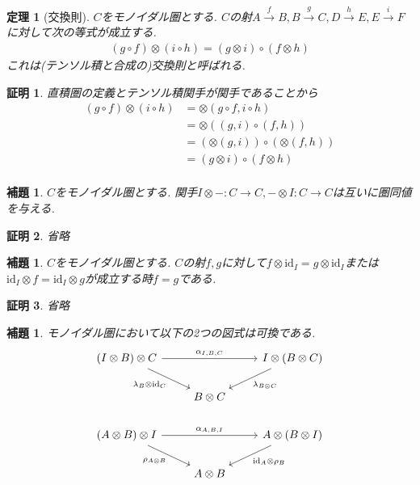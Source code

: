 \documentclass[a4paper,12pt]{ltjsarticle}
\theoremstyle{break}
\newtheorem{thrm}[thm]{定理}
\newtheorem{lem}[thm]{補題}
\newtheorem*{prf}{証明}
\newcommand{\xr}[1]{\xrightarrow{#1}}
\newcommand{\id}{\mathrm{id}}
\newcommand{\ci}{\circ}
\newcommand{\al}{\alpha}
\newcommand{\la}{\lambda}
\newcommand{\ot}{\otimes}
\numberwithin{equation}{section}
\begin{document}
\begin{thrm}[交換則]
  $C$をモノイダル圏とする. $C$の射$A \xr{f} B, B \xr{g} C, D \xr{h} E, E \xr{i} F$に対して次の等式が成立する. 
  \begin{align*}
    (g \ci f) \ot (i \ci h) = (g \ot i) \ci (f \ot h)
  \end{align*}
  これは(テンソル積と合成の)交換則と呼ばれる. 
\end{thrm}

\begin{prf}
  直積圏の定義とテンソル積関手が関手であることから
  \begin{align*}
    (g \ci f) \ot (i \ci h)
    &= \ot(g \ci f, i \ci h) \\
    &= \ot((g,i) \ci (f,h)) \\
    &= (\ot(g,i)) \ci (\ot(f,h)) \\
    &= (g \ot i) \ci (f \ot h) \\
  \end{align*}
\end{prf}

\begin{lem}
  $C$をモノイダル圏とする. 
  関手$I \ot -: C \to C, - \ot I: C \to C$は互いに圏同値を与える. 
\end{lem}

\begin{prf}
  省略
\end{prf}

\begin{lem}
  $C$をモノイダル圏とする. 
  $C$の射$f,g$に対して$f \ot \id_I=g \ot \id_I$または$\id_I \ot f=\id_I \ot g$が成立する時$f=g$である. 
\end{lem}

\begin{prf}
  省略
\end{prf}

\begin{lem}
  モノイダル圏において以下の2つの図式は可換である. 
  \[\begin{tikzcd}
    {(I \ot B) \ot C} && {I \ot (B \ot C)} \\
    & {B \ot C} \\
    {(A \ot B) \ot I} && {A \ot (B \ot I)} \\
    & {A \ot B}
    \arrow["{\al_{I,B,C}}", from=1-1, to=1-3]
    \arrow["{\la_B \ot \id_C}"', from=1-1, to=2-2]
    \arrow["{\al_{A,B,I}}", from=3-1, to=3-3]
    \arrow["{\id_A \ot \rho_B}", from=3-3, to=4-2]
    \arrow["{\rho_{A \ot B}}"', from=3-1, to=4-2]
    \arrow["{\la_{B \ot C}}", from=1-3, to=2-2]
  \end{tikzcd}\]
\end{lem}
\end{document}
